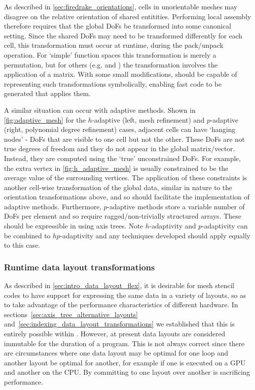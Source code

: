 \documentclass[thesis]{subfiles}
\begin{document}
As described in \cref{sec:firedrake_orientations}, cells in unorientable meshes may disagree on the relative orientation of shared entitities.
Performing local assembly therefore requires that the global DoFs be transformed into some canonical setting.
Since the shared DoFs may need to be transformed differently for each cell, this transformation must occur at runtime, during the pack/unpack operation.
For `simple' function spaces this transformation is merely a permutation, but for others (e.g. \hdiv and \hcurl) the transformation involves the application of a matrix.
With some small modifications,  should be capable of representing such transformations symbolically, enabling fast code to be generated that applies them.

A similar situation can occur with adaptive methods.
Shown in \cref{fig:adaptive_mesh} for the $h$-adaptive (left, mesh refinement) and $p$-adaptive (right, polynomial degree refinement) cases, adjacent cells can have `hanging nodes' - DoFs that are visible to one cell but not the other.
These DoFs are not true degrees of freedom and they do not appear in the global matrix/vector.
Instead, they are computed using the `true' unconstrained DoFs.
For example, the extra vertex in \cref{fig:h_adaptive_mesh} is usually constrained to be the average value of the surrounding vertices.
The application of these constraints is another cell-wise transformation of the global data, similar in nature to the orientation transformations above, and so  should facilitate the implementation of adaptive methods.
Furthermore, $p$-adaptive methods store a variable number of DoFs per element and so require ragged/non-trivially structured arrays.
These should be expressible in  using axis trees.
Note $h$-adaptivity and $p$-adaptivity can be combined to $hp$-adaptivity and any techniques developed should apply equally to this case.

\subsubsection{Runtime data layout transformations}

As described in \cref{sec:intro_data_layout_flex}, it is desirable for mesh stencil codes to have support for expressing the same data in a variety of layouts, so as to take advantage of the performance characteristics of different hardware.
In sections~\ref{sec:axis_tree_alternative_layouts} and~\ref{sec:indexing_data_layout_transformations} we established that this is entirely possible within .
However, at present data layouts are considered immutable for the duration of a program.
This is not always correct since there are circumstances where one data layout may be optimal for one loop and another layout be optimal for another, for example if one is executed on a GPU and another on the CPU.
By committing to one layout over another  is sacrificing performance.
\end{document}
